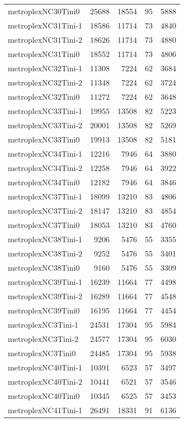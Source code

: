 \begin{longtable}{lrrrr}
metroplexNC30Tini0 & 25688 & 18554 & 95 & 5888 \\
metroplexNC31Tini-1 & 18586 & 11714 & 73 & 4840 \\
metroplexNC31Tini-2 & 18626 & 11714 & 73 & 4880 \\
metroplexNC31Tini0 & 18552 & 11714 & 73 & 4806 \\
metroplexNC32Tini-1 & 11308 & 7224 & 62 & 3684 \\
metroplexNC32Tini-2 & 11348 & 7224 & 62 & 3724 \\
metroplexNC32Tini0 & 11272 & 7224 & 62 & 3648 \\
metroplexNC33Tini-1 & 19955 & 13508 & 82 & 5223 \\
metroplexNC33Tini-2 & 20001 & 13508 & 82 & 5269 \\
metroplexNC33Tini0 & 19913 & 13508 & 82 & 5181 \\
metroplexNC34Tini-1 & 12216 & 7946 & 64 & 3880 \\
metroplexNC34Tini-2 & 12258 & 7946 & 64 & 3922 \\
metroplexNC34Tini0 & 12182 & 7946 & 64 & 3846 \\
metroplexNC37Tini-1 & 18099 & 13210 & 83 & 4806 \\
metroplexNC37Tini-2 & 18147 & 13210 & 83 & 4854 \\
metroplexNC37Tini0 & 18053 & 13210 & 83 & 4760 \\
metroplexNC38Tini-1 & 9206 & 5476 & 55 & 3355 \\
metroplexNC38Tini-2 & 9252 & 5476 & 55 & 3401 \\
metroplexNC38Tini0 & 9160 & 5476 & 55 & 3309 \\
metroplexNC39Tini-1 & 16239 & 11664 & 77 & 4498 \\
metroplexNC39Tini-2 & 16289 & 11664 & 77 & 4548 \\
metroplexNC39Tini0 & 16195 & 11664 & 77 & 4454 \\
metroplexNC3Tini-1 & 24531 & 17304 & 95 & 5984 \\
metroplexNC3Tini-2 & 24577 & 17304 & 95 & 6030 \\
metroplexNC3Tini0 & 24485 & 17304 & 95 & 5938 \\
metroplexNC40Tini-1 & 10391 & 6523 & 57 & 3497 \\
metroplexNC40Tini-2 & 10441 & 6521 & 57 & 3546 \\
metroplexNC40Tini0 & 10345 & 6525 & 57 & 3453 \\
metroplexNC41Tini-1 & 26491 & 18331 & 91 & 6136 \\

\end{longtable}
